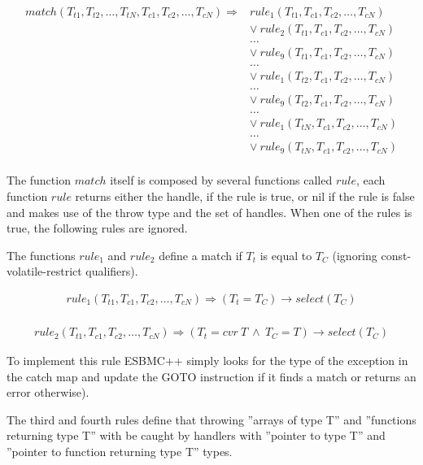 \documentclass[a4paper]{llncs}
\begin{document}
{\[\begin{array}{ll}
match(T_{t1}, T_{t2}, \ldots, T_{tN}, T_{c1}, T_{c2}, \ldots, T_{cN}) \Longrightarrow & rule_1(T_{t1},T_{c1}, T_{c2}, \ldots, T_{cN}) \\
  & \vee \: rule_2(T_{t1},T_{c1}, T_{c2}, \ldots, T_{cN}) \\
  & \ldots \\
  & \vee \: rule_9(T_{t1},T_{c1}, T_{c2}, \ldots, T_{cN}) \\
  & \ldots \\
  & \vee \: rule_1(T_{t2},T_{c1}, T_{c2}, \ldots, T_{cN}) \\
  & \ldots \\
  & \vee \: rule_9(T_{t2},T_{c1}, T_{c2}, \ldots, T_{cN}) \\
  & \ldots \\
  & \vee \: rule_1(T_{tN},T_{c1}, T_{c2}, \ldots, T_{cN}) \\
  & \ldots \\
  & \vee \: rule_9(T_{tN},T_{c1}, T_{c2}, \ldots, T_{cN}) \\
\end{array}\]

The function $match$ itself is composed by several functions called $rule$,
each function $rule$ returns either the handle, if the rule is true, or nil
if the rule is false and makes use of the throw type and the set of handles.
When one of the rules is true, the following rules are ignored.

The functions $rule_1$ and $rule_2$ define a match if $T_{t}$ is equal to $T_{C}$ (ignoring
const-volatile-restrict qualifiers).

\[\begin{array}{ll}
rule_1(T_{t1},T_{c1}, T_{c2}, \ldots, T_{cN}) \Longrightarrow
  (T_{t} = T_{C})\rightarrow select(T_{C}) \\
\end{array}\]

\[\begin{array}{ll}
rule_2(T_{t1},T_{c1}, T_{c2}, \ldots, T_{cN}) \Longrightarrow
  (T_{t} = cvr \: T \: \wedge \: T_{C} = T)\rightarrow select(T_{C})
\end{array}\]

To implement this rule ESBMC++ simply looks for the type of the exception
in the catch map and update the GOTO instruction if it finds a match or
returns an error otherwise).

The third and fourth rules define that throwing ''arrays of type T'' and
''functions returning type T'' with be caught by handlers with
''pointer to type T'' and ''pointer to function returning type T'' types.

}
\end{document}
